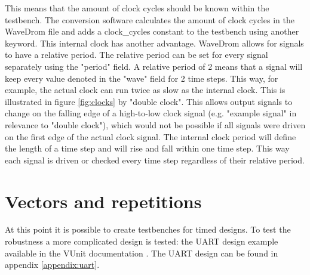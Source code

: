 This means that the amount of clock cycles should be known within the testbench. The conversion software calculates the amount of clock cycles in the WaveDrom file and adds a clock\_cycles constant to the testbench using another keyword.
\npar
This internal clock has another advantage. WaveDrom allows for signals to have a relative period. The relative period can be set for every signal separately using the "period" field. A relative period of 2 means that a signal will keep every value denoted in the "wave" field for 2 time steps. This way, for example, the actual clock can run twice as slow as the internal clock. This is illustrated in figure \ref{fig:clocks} by "double clock". This allows output signals to change on the falling edge of a high-to-low clock signal (e.g. "example signal" in relevance to "double clock"), which would not be possible if all signals were driven on the first edge of the actual clock signal. The internal clock period will define the length of a time step and will rise and fall within one time step. This way each signal is driven or checked every time step regardless of their relative period.\newpage
\section{Vectors and repetitions}
At this point it is possible to create testbenches for timed designs. To test the robustness a more complicated design is tested: the UART design example available in the VUnit documentation \cite{vunit_doc}. The UART design can be found in appendix \ref{appendix:uart}.
